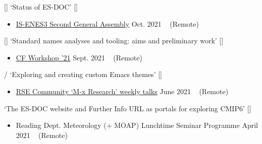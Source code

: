 \begin{talks}
    \talk
	{\faCommentingO \hspace{1mm} [\faEnvelopeO] \hspace{1mm} `Status of ES-DOC' [\href{https://github.com/sadielbartholomew/sadielbartholomew/blob/master/talks-and-workshops/is-enes3-ga2-es-doc-status.pdf}{\small{\linkSymbol}}]}
	{
	\begin{itemize}[leftmargin=.4in]
	    \item \href{https://is.enes.org/workshops-detailed/}{IS-ENES3 Second General Assembly}
	    \hfill Oct. 2021 ~ (Remote)
	\end{itemize}
	}

    \talk
	{\faCommentingO \hspace{1mm} [\faEnvelopeO] \hspace{1mm} `Standard names analyses and tooling: aims and preliminary work' [\href{https://github.com/sadielbartholomew/sadielbartholomew/blob/master/talks-and-workshops/cf-workshop-21-standard-names.pdf}{\small{\linkSymbol}}]}
	{
	\begin{itemize}[leftmargin=.4in]
	    \item \href{https://cfconventions.org/Meetings/2021-Workshop.html}{CF Workshop '21}
	    \hfill Sept. 2021 ~ (Remote)
	\end{itemize}
	}

    \talk
	{\faCommentingO/\faWrench \hspace{1mm} `Exploring and creating custom Emacs themes' [\href{https://github.com/sadielbartholomew/sadielbartholomew/blob/master/talks-and-workshops/emacs-themes-talk.org}{\small{\linkSymbol}}]}
	{
	\begin{itemize}[leftmargin=.4in]
	    \item \href{https://m-x-research.github.io/}{RSE Community `M-x Research' weekly talks}
	    \hfill June 2021 ~ (Remote)
	\end{itemize}
	}

    \talk
	{\faCommentingO \hspace{1mm} `The ES-DOC website and Further Info URL as portals for exploring CMIP6' [\href{https://github.com/sadielbartholomew/sadielbartholomew/blob/master/talks-and-workshops/es-doc-portals-for-cmip6.pdf}{\small{\linkSymbol}}]}
	{
	\begin{itemize}[leftmargin=.4in]
	    \item Reading Dept. Meteorology (+ MOAP) Lunchtime Seminar Programme
	    \hfill April 2021 ~ (Remote)
	\end{itemize}
	}


\end{talks}
